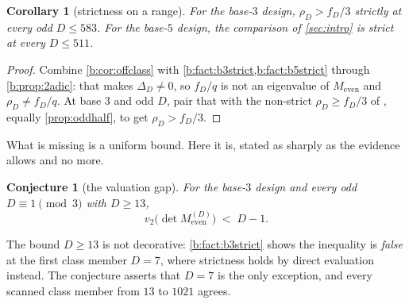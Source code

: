 \documentclass[11pt]{amsart}
\newtheorem{corollary}[theorem]{Corollary}
\newtheorem{conjecture}[theorem]{Conjecture}
\theoremstyle{definition}
\theoremstyle{remark}
\begin{document}
\begin{corollary}[strictness on a range]
\label{b:cor:range}
For the base-$3$ design, $\rho_D > f_D/3$ strictly at every odd $D \le 583$. For the base-$5$ design, the comparison of \cref{sec:intro} is strict at every $D \le 511$.
\end{corollary}

\begin{proof}
Combine \cref{b:cor:offclass} with \cref{b:fact:b3strict,b:fact:b5strict} through \cref{b:prop:2adic}: that makes $\Delta_D \ne 0$, so $f_D/q$ is not an eigenvalue of $M_{\mathrm{even}}$ and $\rho_D \ne f_D/q$. At base $3$ and odd $D$, pair that with the non-strict $\rho_D \ge f_D/3$ of \cite{slice-order}, equally \cref{prop:oddhalf}, to get $\rho_D > f_D/3$.
\end{proof}

What is missing is a uniform bound. Here it is, stated as sharply as the evidence allows and no more.

\begin{conjecture}[the valuation gap]
\label{b:con:V}
For the base-$3$ design and every odd $D \equiv 1 \pmod 3$ with $D \ge 13$,
\[
  v_2\bigl(\det M_{\mathrm{even}}^{(D)}\bigr) \;<\; D - 1 .
\]
\end{conjecture}

The bound $D \ge 13$ is not decorative: \cref{b:fact:b3strict} shows the inequality is \emph{false} at the first class member $D = 7$, where strictness holds by direct evaluation instead. The conjecture asserts that $D = 7$ is the only exception, and every scanned class member from $13$ to $1021$ agrees.
\end{document}
